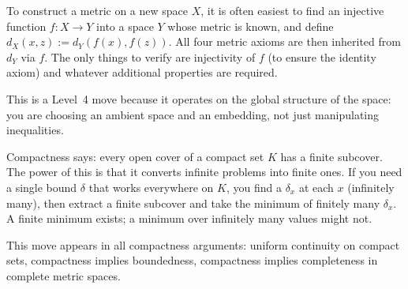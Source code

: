 \begin{remark}
To construct a metric on a new space $X$, it is often easiest to
find an injective function $f : X \to Y$ into a space $Y$ whose metric
is known, and define $d_X(x,z) := d_Y(f(x), f(z))$. All four metric
axioms are then inherited from $d_Y$ via $f$. The only things to
verify are injectivity of $f$ (to ensure the identity axiom) and
whatever additional properties are required.

This is a Level~4 move because it operates on the global structure
of the space: you are choosing an ambient space and an embedding,
not just manipulating inequalities.
\end{remark}

\begin{remark}
Compactness says: every open cover of a compact set $K$ has a finite
subcover. The power of this is that it converts infinite problems into
finite ones. If you need a single bound $\delta$ that works everywhere
on $K$, you find a $\delta_x$ at each $x$ (infinitely many), then
extract a finite subcover and take the minimum of finitely many $\delta_x$.
A finite minimum exists; a minimum over infinitely many values might not.

This move appears in all compactness arguments: uniform continuity on
compact sets, compactness implies boundedness, compactness implies
completeness in complete metric spaces.
\end{remark}
